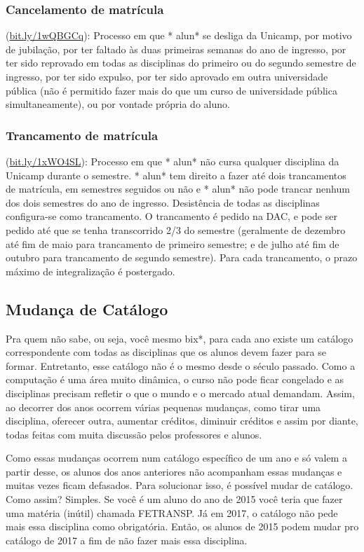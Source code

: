 \subsubsection{Cancelamento de matrícula} (\url{bit.ly/1wQBGCq}):
Processo em que * alun* se desliga da Unicamp, por motivo de jubilação, por ter
faltado às duas primeiras semanas do ano de ingresso, por ter sido reprovado em
todas as disciplinas do primeiro ou do segundo semestre de ingresso, por ter
sido expulso, por ter sido aprovado em outra universidade pública (não é
permitido fazer mais do que um curso de universidade pública simultaneamente),
ou por vontade própria do aluno.
\subsubsection{Trancamento de matrícula} (\url{bit.ly/1xWO4SL}): Processo
em que * alun* não cursa qualquer disciplina da Unicamp durante o semestre. *
alun* tem direito a fazer até dois trancamentos de matrícula, em semestres
seguidos ou não e * alun* não pode trancar nenhum dos dois semestres do ano de
ingresso. Desistência de todas as disciplinas configura-se como trancamento. O
trancamento é pedido na DAC, e pode ser pedido até que se tenha transcorrido 2/3
do semestre (geralmente de dezembro até fim de maio para trancamento de primeiro
semestre; e de julho até fim de outubro para trancamento de segundo
semestre). Para cada trancamento, o prazo máximo de integralização é postergado.

\subsection{Mudança de Catálogo}

Pra quem não sabe, ou seja, você mesmo bix*, para cada ano existe um catálogo 
correspondente com todas as disciplinas que os alunos devem fazer para se formar. 
Entretanto, esse catálogo não é o mesmo desde o século passado. Como a computação 
é uma área muito  dinâmica, o curso não pode ficar congelado e as disciplinas 
precisam refletir o que o  mundo e o mercado atual demandam. Assim, ao decorrer
dos anos ocorrem várias pequenas mudanças, como tirar uma disciplina, oferecer 
outra, aumentar créditos, diminuir créditos e assim por diante, todas feitas 
com muita discussão pelos professores e alunos. 

Como essas mudanças ocorrem num catálogo específico de um ano e só valem a partir
desse, os alunos dos anos anteriores não acompanham essas mudanças e muitas vezes
ficam defasados. Para solucionar isso, é possível mudar de catálogo.
Como assim? Simples. Se você é um aluno do ano de 2015 você teria que fazer uma 
matéria (inútil) chamada FETRANSP. Já em 2017, o catálogo não pede mais essa 
disciplina como obrigatória. Então, os alunos de 2015 podem mudar pro catálogo de
2017 a fim de não fazer mais essa disciplina. 

